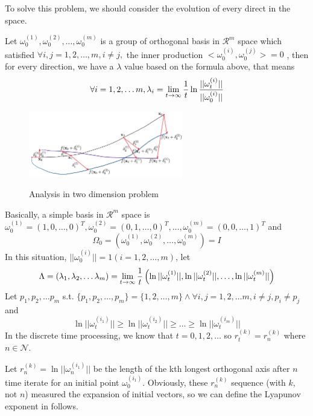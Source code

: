 \documentclass[12pt]{article}
\theoremstyle{plain}
\begin{document}
To solve this problem, we should consider the evolution of every direct in the space. 

Let $\omega^{(1)}_0, \omega^{(2)}_0, \ldots, \omega^{(m)}_0$ is a group of orthogonal basis in $\mathcal R^m$ space which satisfied $\forall i, j = 1, 2, \ldots, m, i \neq j, $ the inner production $ <\omega^{(i)}_0, \omega^{(j)}_0> = 0$ , then for every direction, we have a $\lambda$ value based on the formula above, that means
$$
\forall i = 1, 2, \ldots m, \lambda_i = \lim_{t \rightarrow \infty}{1\over t}\ln{\mathbf||\omega^{(i)}_t|| \over \mathbf ||\omega^{(i)}_0||}
$$

\begin{figure}[H]
\begin{center}
\includegraphics[width=0.6\textwidth]{figure/section5/Lyapunov-spec-proof-3.png} \\
\caption{Analysis in two dimension problem}\label{Lyapunov-spec-proof-3}
\end{center}
\end{figure}

Basically, a simple basis in $\mathcal R^m$ space is $\omega^{(1)}_0 = (1, 0, \ldots, 0)^T, \omega^{(2)}_0 = (0, 1, \ldots, 0)^T, \ldots, \omega^{(m)}_0 = (0, 0, \ldots, 1)^T$ and 
$$
\Omega_0 = (\omega^{(1)}_0, \omega^{(2)}_0, \ldots, \omega^{(m)}_0) = I
$$
In this situation, $||\omega^{(i)}_0|| = 1(i = 1, 2, \ldots, m)$, let 
$$
\Lambda = (\lambda_1, \lambda_2, \ldots \lambda_m) 
= \lim_{t \rightarrow \infty}{1\over t}\left(\ln{||\omega^{(1)}_t|| }, \ln{||\omega^{(2)}_t|| }, \ldots, \ln{||\omega^{(m)}_t|| }\right)
$$
Let $p_1, p_2, \ldots p_m$ s.t. $\{p_1, p_2, \ldots, p_m\} = \{1, 2, \ldots, m\} \land \forall i, j = 1, 2, \ldots m, i \neq j, p_i \neq p_j$ and 
$$
\ln{||\omega^{(i_1)}_t|| }\geq \ln{||\omega^{(i_2)}_t|| } \geq \ldots \geq \ln{||\omega^{(i_m)}_t|| }
$$
In the discrete time processing, we know that $t = 0, 1, 2, \ldots$ so $r_t^{(k)} = r_n^{(k)}$ where $n \in \mathcal N$. 

Let $r_n^{(k)} = \ln{||\omega^{(i_1)}_n||}$ be the length of the kth longest orthogonal axis after $n$ time iterate for an initial point $\omega^{(i_1)}_0$. Obviously, these $r_n^{(k)}$ sequence (with $k$, not $n$) measured the expansion of initial vectors, so we can define the Lyapunov exponent in follows.
\end{document}
